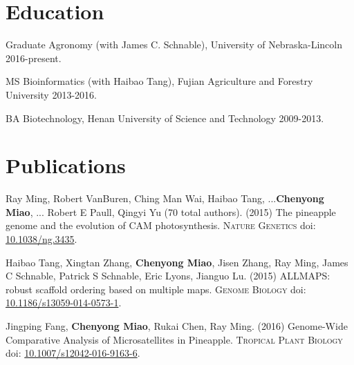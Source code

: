 \documentclass[letterpaper]{article}
\renewenvironment{itemize}{
  \begin{list}{}{
    \setlength{\leftmargin}{1.5em}
  }
}{
  \end{list}
}
\begin{document}
\section*{Education}
\begin{itemize}
 \item Graduate Agronomy (with James C. Schnable), University of Nebraska-Lincoln 2016-present.
 \item MS Bioinformatics (with Haibao Tang), Fujian Agriculture and Forestry University 2013-2016.
 \item BA Biotechnology, Henan University of Science and Technology 2009-2013.
\end{itemize}



\section*{Publications} 
\begin{etaremune}
\item Ray Ming, Robert VanBuren, Ching Man Wai, Haibao Tang, ...{\bf Chenyong Miao}, ... Robert E Paull, Qingyi Yu (70 total authors). (2015) The pineapple genome and the evolution of CAM photosynthesis. \textsc {Nature Genetics} doi: \href{http://www.nature.com/ng/journal/v47/n12/full/ng.3435.html}{10.1038/ng.3435}.
\item Haibao Tang, Xingtan Zhang, {\bf Chenyong Miao}, Jisen Zhang, Ray Ming, James C Schnable, Patrick S Schnable, Eric Lyons, Jianguo Lu. (2015) ALLMAPS: robust scaffold ordering based on multiple maps. \textsc {Genome Biology} doi: \href{http://genomebiology.biomedcentral.com/articles/10.1186/s13059-014-0573-1}{10.1186/s13059-014-0573-1}.
\item Jingping Fang, {\bf Chenyong Miao}, Rukai Chen, Ray Ming. (2016) Genome-Wide Comparative Analysis of Microsatellites in Pineapple. \textsc {Tropical Plant Biology} doi: \href{https://link.springer.com/article/10.1007/s12042-016-9163-6}{10.1007/s12042-016-9163-6}.
\end{etaremune}
\end{document}
